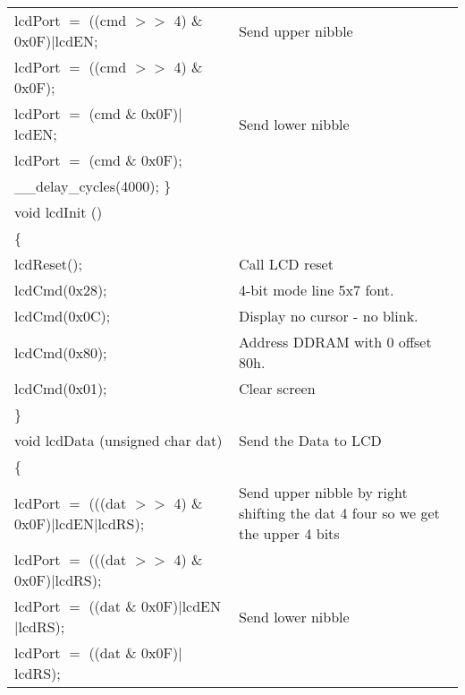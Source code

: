\documentclass[12pt, letterpaper]{article}
\begin{document}
\begin{longtable}{|p{6cm}||p{5cm}|}
        \hspace{0.1cm} lcdPort $=$ ((cmd $>>$  4) \& 0x0F)$|$lcdEN; & Send upper nibble \\
        \hspace{0.1cm} lcdPort $=$ ((cmd $>>$ 4) \& 0x0F); & \\

       
        \hspace{0.1cm} lcdPort $=$ (cmd \& 0x0F)$|$lcdEN; & Send lower nibble \\
        \hspace{0.1cm} lcdPort $=$ (cmd \& 0x0F); & \\

        \hspace{0.1cm} \_\_delay\_cycles(4000);
\} & \\

void lcdInit () & \\
\{ & \\
        \hspace{0.1cm} lcdReset(); & Call LCD reset\\
        \hspace{0.1cm} lcdCmd(0x28);   &     4-bit mode \- 2 line \- 5x7 font.\\
        \hspace{0.1cm} lcdCmd(0x0C);   &     Display no cursor - no blink. \\
        \hspace{0.1cm} lcdCmd(0x80);   &     Address DDRAM with 0 offset 80h.\\
        \hspace{0.1cm} lcdCmd(0x01);   &     Clear screen \\
\} & \\


void lcdData (unsigned char dat) & Send the Data to LCD\\
\{ & \\
       
       \hspace{0.1cm} lcdPort $=$ (((dat $>>$ 4) \& 0x0F)$|$lcdEN$|$lcdRS); & Send upper nibble by right shifting the dat 4 four so we get the upper 4 bits\\
       \hspace{0.1cm} lcdPort $=$ (((dat $>>$ 4) \& 0x0F)$|$lcdRS); & \\

        
       \hspace{0.1cm} lcdPort $=$ ((dat \& 0x0F)$|$lcdEN$|$lcdRS); & Send lower nibble\\
       \hspace{0.1cm} lcdPort $=$ ((dat \& 0x0F)$|$lcdRS); & \\


\end{longtable}
\end{document}
